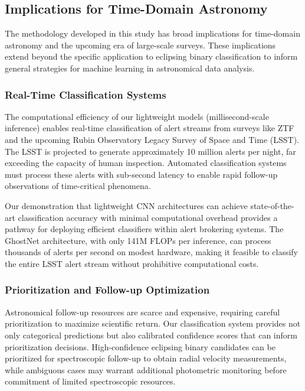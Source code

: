 \documentclass[11pt,a4paper]{article}
\begin{document}
\subsection{Implications for Time-Domain Astronomy}

The methodology developed in this study has broad implications for time-domain astronomy and the upcoming era of large-scale surveys. These implications extend beyond the specific application to eclipsing binary classification to inform general strategies for machine learning in astronomical data analysis.

\subsubsection{Real-Time Classification Systems}

The computational efficiency of our lightweight models (millisecond-scale inference) enables real-time classification of alert streams from surveys like ZTF and the upcoming Rubin Observatory Legacy Survey of Space and Time (LSST). The LSST is projected to generate approximately 10 million alerts per night, far exceeding the capacity of human inspection. Automated classification systems must process these alerts with sub-second latency to enable rapid follow-up observations of time-critical phenomena.

Our demonstration that lightweight CNN architectures can achieve state-of-the-art classification accuracy with minimal computational overhead provides a pathway for deploying efficient classifiers within alert brokering systems. The GhostNet architecture, with only 141M FLOPs per inference, can process thousands of alerts per second on modest hardware, making it feasible to classify the entire LSST alert stream without prohibitive computational costs.

\subsubsection{Prioritization and Follow-up Optimization}

Astronomical follow-up resources are scarce and expensive, requiring careful prioritization to maximize scientific return. Our classification system provides not only categorical predictions but also calibrated confidence scores that can inform prioritization decisions. High-confidence eclipsing binary candidates can be prioritized for spectroscopic follow-up to obtain radial velocity measurements, while ambiguous cases may warrant additional photometric monitoring before commitment of limited spectroscopic resources.
\end{document}
